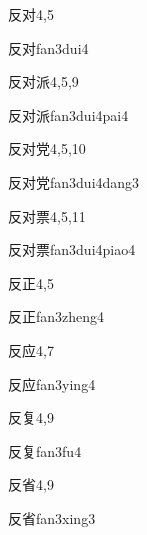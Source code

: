 \begin{entry}{反对}{4,5}
  \begin{phonetics}{反对}{fan3dui4}
  \end{phonetics}
\end{entry}

\begin{entry}{反对派}{4,5,9}
  \begin{phonetics}{反对派}{fan3dui4pai4}
  \end{phonetics}
\end{entry}

\begin{entry}{反对党}{4,5,10}
  \begin{phonetics}{反对党}{fan3dui4dang3}
  \end{phonetics}
\end{entry}

\begin{entry}{反对票}{4,5,11}
  \begin{phonetics}{反对票}{fan3dui4piao4}
  \end{phonetics}
\end{entry}

\begin{entry}{反正}{4,5}
  \begin{phonetics}{反正}{fan3zheng4}
  \end{phonetics}
\end{entry}

\begin{entry}{反应}{4,7}
  \begin{phonetics}{反应}{fan3ying4}
  \end{phonetics}
\end{entry}

\begin{entry}{反复}{4,9}
  \begin{phonetics}{反复}{fan3fu4}
  \end{phonetics}
\end{entry}

\begin{entry}{反省}{4,9}
  \begin{phonetics}{反省}{fan3xing3}
  \end{phonetics}
\end{entry}

